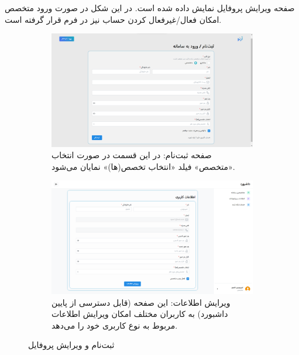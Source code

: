 صفحه ویرایش پروفایل نمایش داده شده است. در این شکل در صورت ورود متخصص امکان فعال/غیرفعال کردن حساب نیز در فرم قرار گرفته است.

\begin{figure}[h]
	\centering
	\begin{subfigure}[b]{\textwidth}
		\centering
		\includegraphics[width=\textwidth]{figs/initial-ui/signup}
		\caption[صفحه ثبت‌نام: در این قسمت در صورت انتخاب «متخصص» فیلد «انتخاب تخصص(ها)» نمایان می‌شود.]%
		{{\small صفحه ثبت‌نام: در این قسمت در صورت انتخاب «متخصص» فیلد «انتخاب تخصص(ها)» نمایان می‌شود.}}    
		\label{signup}
	\end{subfigure}
	\begin{subfigure}[b]{\textwidth}   
		\centering 
		\includegraphics[width=\textwidth]{figs/initial-ui/edit-profile}
		\caption[ویرایش اطلاعات: این صفحه (قابل دسترسی از پایین داشبورد) به کاربران مختلف امکان ویرایش اطلاعات مربوط به نوع کاربری خود را می‌دهد.]%
		{{\small ویرایش اطلاعات: این صفحه (قابل دسترسی از پایین داشبورد) به کاربران مختلف امکان ویرایش اطلاعات مربوط به نوع کاربری خود را می‌دهد.}}    
		\label{edit-profile}
	\end{subfigure}
	\caption[ثبت‌نام و ویرایش پروفایل]
	{\small ثبت‌نام و ویرایش پروفایل} 
	\label{req-15}
\end{figure}

